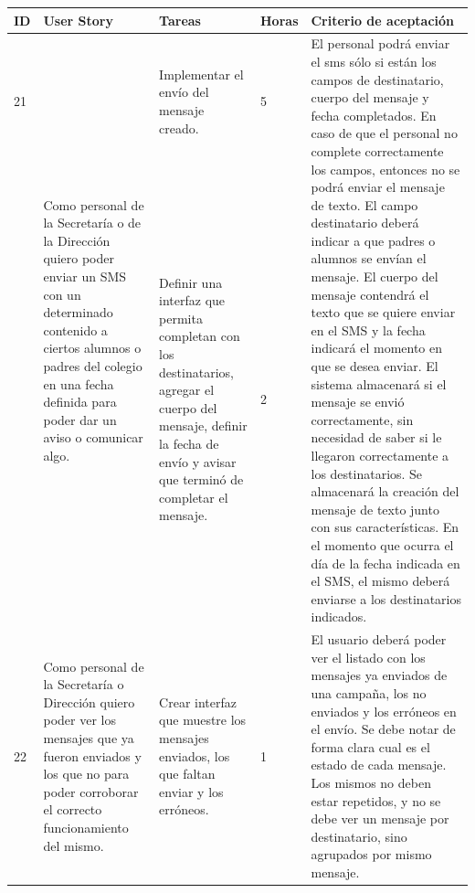 \documentclass[a4paper, 11pt]{article}
\begin{document}
\begin{table}[H]
\centering
\begin{tabular}{ | p{0.5cm} | p{4cm} | p{5cm} | p{0.85cm} | p{5cm} |}
\hline 
ID & User Story & Tareas & Horas & Criterio de aceptación \\ \hline \hline

21 & \multirow{2}{4cm}{Como personal de la Secretaría o de la Dirección quiero poder enviar un SMS con un determinado contenido a ciertos alumnos o padres del colegio en una fecha definida para poder dar un aviso o comunicar algo.} & Implementar el envío del mensaje creado. & 5 & \multirow{2}{5cm}{El personal podrá enviar el sms sólo si están los campos de destinatario, cuerpo del mensaje y fecha completados. En caso de que el personal no complete correctamente los campos, entonces no se podrá enviar el mensaje de texto. El campo destinatario deberá indicar a que padres o alumnos se envían el mensaje. El cuerpo del mensaje contendrá el texto que se quiere enviar en el SMS y la fecha indicará el momento en que se desea enviar. El sistema almacenará si el mensaje se envió correctamente, sin necesidad de saber si le llegaron correctamente a los destinatarios.
Se almacenará la creación del mensaje de texto junto con sus características.
En el momento que ocurra el día de la fecha indicada en el SMS, el mismo deberá enviarse a los destinatarios indicados. } \\[7cm] \cline{3-4}
& & Definir una interfaz que permita completan con los destinatarios, agregar el cuerpo del mensaje, definir la fecha de envío y avisar que terminó de completar el mensaje. & 2 & \\[7cm] \hline



22 & Como personal de la Secretaría o Dirección quiero poder ver los mensajes que ya fueron enviados y los que no para poder corroborar el correcto funcionamiento del mismo. & Crear interfaz que muestre los mensajes enviados, los que faltan enviar y los erróneos. & 1 & El usuario deberá poder ver el listado con los mensajes ya enviados de una campaña, los no enviados y los erróneos en el envío. Se debe notar de forma clara cual es el estado de cada mensaje. Los mismos no deben estar repetidos, y no se debe ver un mensaje por destinatario, sino agrupados por mismo mensaje.   \\ \hline


\end{tabular}
\end{table}
\end{document}

